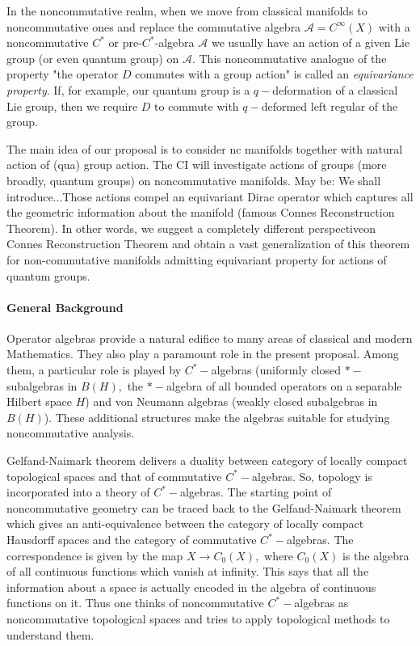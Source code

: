 \documentclass{article}
\begin{document}
In the noncommutative realm, when we move from classical manifolds to noncommutative ones and replace the commutative algebra $\mathcal{A}=C^{\infty}(X)$ with a noncommutative $C^*$ or pre-$C^*$-algebra $\mathcal{A}$ we usually have an action of a given Lie group (or even quantum group) on $\mathcal{A}.$ This noncommutative analogue of the property "the operator $D$ commutes with a group action" is called an {\it equivariance property}. If, for example, our quantum group is a $q-$deformation of a classical Lie group, then we require $D$ to commute with $q-$deformed left regular of the group.


The main idea of our proposal is to consider nc manifolds together with natural action of (qua) group action.
The CI will investigate actions of groups (more broadly, quantum groups) on noncommutative manifolds. {\color{red} May be: We shall introduce...}Those actions compel an equivariant Dirac operator which captures all the geometric information about the manifold (famous Connes Reconstruction Theorem). In other words, we suggest a completely different perspectiveon Connes Reconstruction Theorem and obtain a vast generalization of this theorem for non-commutative manifolds admitting equivariant property for actions of quantum groups.

\paragraph*{General Background}

Operator algebras provide a natural edifice to many areas of classical and modern Mathematics. They also play a paramount role in the present proposal. Among them, a particular role is played by $C^{\ast}-$algebras (uniformly closed $\ast-$subalgebras in $B(H),$ the $\ast-$algebra of all bounded operators on a separable Hilbert space $H$) and von Neumann algebras (weakly closed subalgebras in $B(H)$). These additional structures make the algebras suitable for studying noncommutative analysis. 

Gelfand-Naimark theorem delivers a duality between category of locally compact topological spaces and that of commutative $C^{\ast}-$algebras. So, topology is incorporated into a theory of $C^{\ast}-$algebras. The starting point of noncommutative geometry can be traced back to the Gelfand-Naimark theorem which gives an anti-equivalence between the category of locally compact Hausdorff spaces and the category of commutative $C^{\ast}-$algebras. The correspondence is given by the map $X\to C_0(X),$ where $C_0(X)$ is the algebra of all continuous functions which vanish at infinity. This says that all the information about a space is actually encoded in the algebra of continuous functions on it. Thus one thinks of noncommutative $C^{\ast}-$algebras as noncommutative topological spaces and tries to apply topological methods to understand them. 
\end{document}
